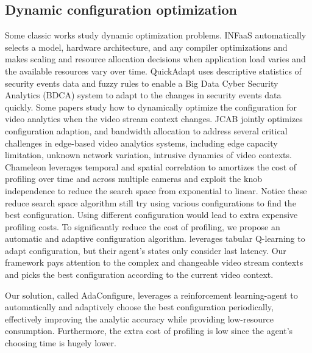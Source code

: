 \subsection{Dynamic configuration optimization}
Some classic works study dynamic optimization problems. INFaaS \cite{romero2019infaas} automatically selects a model, hardware architecture, and any compiler optimizations and makes scaling and resource allocation decisions when application load varies and the available resources vary over time. QuickAdapt \cite{ullah2019quickadapt} uses descriptive statistics of security events data and fuzzy rules to enable a Big Data Cyber Security Analytics (BDCA) system to adapt to the changes in security events data quickly. Some papers study how to dynamically optimize the configuration for video analytics when the video stream context changes. JCAB \cite{wang2020jcab} jointly optimizes configuration adaption, and bandwidth allocation to address several critical challenges in edge-based video analytics systems, including edge capacity limitation, unknown network variation, intrusive dynamics of video contexts. Chameleon \cite{jiang2018chameleon} leverages temporal and spatial correlation to amortizes the cost of profiling over time and across multiple cameras and exploit the knob independence to reduce the search space from exponential to linear. Notice these reduce search space algorithm still try using various configurations to find the best configuration. Using different configuration would lead to extra expensive profiling costs. To significantly reduce the cost of profiling, we propose an automatic and adaptive configuration algorithm. \cite{argerich2019orchestration} leverages tabular Q-learning to adapt configuration, but their agent's states only consider last latency. Our framework pays attention to the complex and changeable video stream contexts and picks the best configuration according to the current video context. 

Our solution, called AdaConfigure, leverages a reinforcement learning-agent to automatically and adaptively choose the best configuration periodically, effectively improving the analytic accuracy while providing low-resource consumption. Furthermore, the extra cost of profiling is low since the agent's choosing time is hugely lower. 


